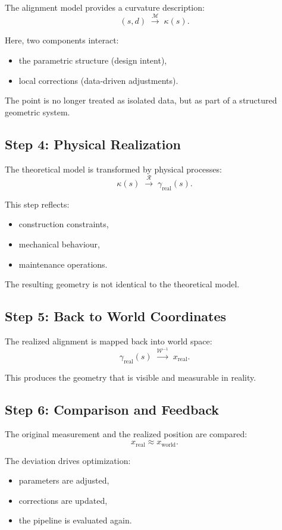 The alignment model provides a curvature description:
\[
(s,d)
\;\xrightarrow{\mathcal{M}}\;
\kappa(s).
\]

Here, two components interact:
\begin{itemize}
\item the parametric structure (design intent),
\item local corrections (data-driven adjustments).
\end{itemize}

The point is no longer treated as isolated data, but as part of a
structured geometric system.

\subsection{Step 4: Physical Realization}

The theoretical model is transformed by physical processes:
\[
\kappa(s)
\;\xrightarrow{\mathcal{R}}\;
\gamma_{\mathrm{real}}(s).
\]

This step reflects:
\begin{itemize}
\item construction constraints,
\item mechanical behaviour,
\item maintenance operations.
\end{itemize}

The resulting geometry is not identical to the theoretical model.

\subsection{Step 5: Back to World Coordinates}

The realized alignment is mapped back into world space:
\[
\gamma_{\mathrm{real}}(s)
\;\xrightarrow{\mathcal{W}^{-1}}\;
x_{\mathrm{real}}.
\]

This produces the geometry that is visible and measurable in reality.

\subsection{Step 6: Comparison and Feedback}

The original measurement and the realized position are compared:
\[
x_{\mathrm{real}} \approx x_{\mathrm{world}}.
\]

The deviation drives optimization:
\begin{itemize}
\item parameters are adjusted,
\item corrections are updated,
\item the pipeline is evaluated again.
\end{itemize}

